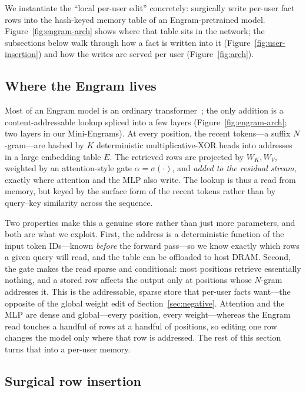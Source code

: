 \documentclass[letterpaper]{article} %
\begin{document}
We instantiate the ``local per-user edit'' concretely: surgically write
per-user fact rows into the hash-keyed memory table of an
Engram-pretrained model. Figure~\ref{fig:engram-arch} shows where that
table sits in the network; the subsections below walk through how a
fact is written into it (Figure~\ref{fig:user-insertion}) and
how the writes are served per user (Figure~\ref{fig:arch}).

\subsection{Where the Engram lives}
\label{sec:engram-arch-text}

Most of an Engram model is an ordinary
transformer~\citep{vaswani2017transformer}; the only addition is
a content-addressable lookup spliced into a few layers
(Figure~\ref{fig:engram-arch}; two layers in our Mini-Engrams).
At every position, the recent tokens---a suffix $N$-gram---are
hashed by $K$ deterministic multiplicative-XOR heads into
addresses in a large embedding table $E$. The retrieved rows are
projected by $W_K, W_V$, weighted by an attention-style gate
$\alpha=\sigma(\cdot)$, and \emph{added to the residual stream},
exactly where attention and the MLP also write. The lookup is
thus a read from memory, but keyed by the surface form of the
recent tokens rather than by query--key similarity across the
sequence.

Two properties make this a genuine store rather than just more
parameters, and both are what we exploit. First, the address is a
deterministic function of the input token IDs---known
\emph{before} the forward pass---so we know exactly which rows a
given query will read, and the table can be offloaded to host
DRAM. Second, the gate makes the read sparse and conditional:
most positions retrieve essentially nothing, and a stored row
affects the output only at positions whose $N$-gram addresses it.
This is the addressable, sparse store that per-user facts
want---the opposite of the global weight edit of
Section~\ref{sec:negative}.
Attention and the MLP are dense and global---every position,
every weight---whereas the Engram read touches a handful of rows
at a handful of positions, so editing one row changes the model
only where that row is addressed. The rest of this section turns
that into a per-user memory.

\subsection{Surgical row insertion}
\end{document}
